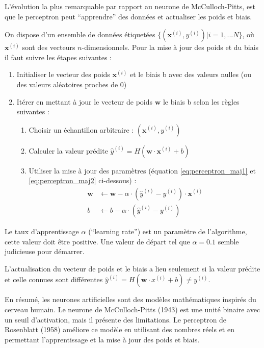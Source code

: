 \par{L'évolution la plus remarquable par rapport au neurone de McCulloch-Pitts, est que le perceptron peut ``apprendre'' des données et actualiser les poids et biais.}
\par{On dispose d'un ensemble de données étiquetées $\{(\mathbf{x}^{(i)}, y^{(i)})| i = 1, ... N\}$, où $\mathbf{x}^{(i)}$ sont des vecteurs $n$-dimensionnels. Pour la mise à jour des poids et du biais il faut suivre les étapes suivantes :}
\begin{enumerate}
    \item Initialiser le vecteur des poids $\mathbf{x}^{(i)}$ et le biais b avec des valeurs nulles (ou des valeurs aléatoires proches de 0)
    \item Itérer en mettant à jour le vecteur de poids $\mathbf{w}$ le biais b selon les règles suivantes :
    \begin{enumerate}
        \item Choisir un échantillon arbitraire : $(\mathbf{x}^{(i)}, y^{(i)})$
        \item Calculer la valeur prédite $\hat{y}^{(i)} = H(\mathbf{w} \cdot \mathbf{x}^{(i)} + b)$
        \item Utiliser la mise à jour des paramètres (équation \ref{eq:perceptron_maj1} et \ref{eq:perceptron_maj2} ci-dessous) :
        \vspace{20pt}
        \begin{align}
            \mathbf{w} &\leftarrow \mathbf{w} - \alpha \cdot (\hat{y}^{(i)} - y^{(i)}) \cdot \mathbf{x}^{(i)}
            \label{eq:perceptron_maj1}\\
            b &\leftarrow b - \alpha \cdot (\hat{y}^{(i)} - y^{(i)})
            \label{eq:perceptron_maj2}
        \end{align}
    \end{enumerate}
\end{enumerate}

Le taux d'apprentissage $\alpha$ (``learning rate'') est un paramètre de l'algorithme, cette valeur doit être positive. Une valeur de départ tel que $\alpha = 0.1$ semble judicieuse pour démarrer.

L'actualisation du vecteur de poids et le biais a lieu seulement si la valeur prédite et celle connues sont différentes $\hat{y}^{(i)} = H(\mathbf{w} \cdot x^{(i)} + b) \neq y^{(i)}$.

En résumé, les neurones artificielles sont des modèles mathématiques inspirés du cerveau humain. Le neurone de McCulloch-Pitts (1943) est une unité binaire avec un seuil d'activation, mais il présente des limitations. Le perceptron de Rosenblatt (1958) améliore ce modèle en utilisant des nombres réels et en permettant l'apprentissage et la mise à jour des poids et biais.

